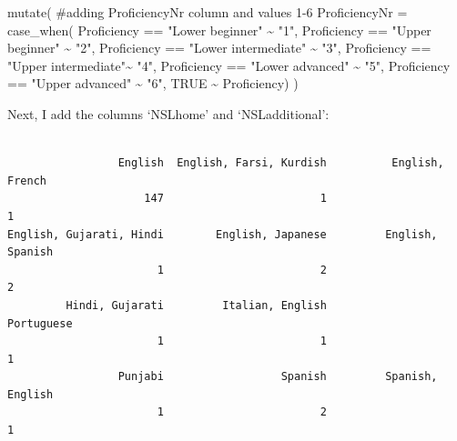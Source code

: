 \documentclass[
  letterpaper,
  DIV=11,
  numbers=noendperiod]{scrartcl}
\newenvironment{Shaded}{\begin{snugshade}}{\end{snugshade}}
\newcommand{\AttributeTok}[1]{\textcolor[rgb]{0.40,0.45,0.13}{#1}}
\newcommand{\CommentTok}[1]{\textcolor[rgb]{0.37,0.37,0.37}{#1}}
\newcommand{\ConstantTok}[1]{\textcolor[rgb]{0.56,0.35,0.01}{#1}}
\newcommand{\FunctionTok}[1]{\textcolor[rgb]{0.28,0.35,0.67}{#1}}
\newcommand{\NormalTok}[1]{\textcolor[rgb]{0.00,0.23,0.31}{#1}}
\newcommand{\SpecialCharTok}[1]{\textcolor[rgb]{0.37,0.37,0.37}{#1}}
\newcommand{\StringTok}[1]{\textcolor[rgb]{0.13,0.47,0.30}{#1}}
\begin{document}
\begin{Shaded}
\begin{Highlighting}[]
  \FunctionTok{mutate}\NormalTok{( }\CommentTok{\#adding ProficiencyNr column and values 1{-}6}
    \AttributeTok{ProficiencyNr =} \FunctionTok{case\_when}\NormalTok{(}
\NormalTok{      Proficiency }\SpecialCharTok{==} \StringTok{"Lower beginner"} \SpecialCharTok{\textasciitilde{}} \StringTok{"1"}\NormalTok{,}
\NormalTok{      Proficiency }\SpecialCharTok{==} \StringTok{"Upper beginner"} \SpecialCharTok{\textasciitilde{}} \StringTok{"2"}\NormalTok{,}
\NormalTok{      Proficiency }\SpecialCharTok{==} \StringTok{"Lower intermediate"} \SpecialCharTok{\textasciitilde{}} \StringTok{"3"}\NormalTok{,}
\NormalTok{      Proficiency }\SpecialCharTok{==} \StringTok{"Upper intermediate"}\SpecialCharTok{\textasciitilde{}} \StringTok{"4"}\NormalTok{,}
\NormalTok{      Proficiency }\SpecialCharTok{==} \StringTok{"Lower advanced"} \SpecialCharTok{\textasciitilde{}} \StringTok{"5"}\NormalTok{,}
\NormalTok{      Proficiency }\SpecialCharTok{==} \StringTok{"Upper advanced"} \SpecialCharTok{\textasciitilde{}} \StringTok{"6"}\NormalTok{,}
      \ConstantTok{TRUE} \SpecialCharTok{\textasciitilde{}}\NormalTok{ Proficiency)}
\NormalTok{    )}
\end{Highlighting}
\end{Shaded}

Next, I add the columns `NSLhome' and `NSLadditional':

\begin{Shaded}
\end{Shaded}

\begin{verbatim}

                 English  English, Farsi, Kurdish          English, French 
                     147                        1                        1 
English, Gujarati, Hindi        English, Japanese         English, Spanish 
                       1                        2                        2 
         Hindi, Gujarati         Italian, English               Portuguese 
                       1                        1                        1 
                 Punjabi                  Spanish         Spanish, English 
                       1                        2                        1 
\end{verbatim}
\end{document}
